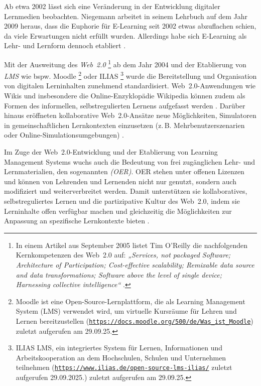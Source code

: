 Ab etwa 2002 lässt sich eine Veränderung in der Entwicklung digitaler Lernmedien beobachten. Niegemann arbeitet in seinem Lehrbuch auf dem Jahr 2009 heraus, dass die Euphorie für E-Learning seit 2002 etwas abzuflachen schien, da viele Erwartungen nicht erfüllt wurden. Allerdings habe sich E-Learning als Lehr- und Lernform dennoch etabliert \parencite[S.~14]{niegemann_kompendium_2008}.

Mit der Ausweitung des \textit{Web~2.0} \footnote{In einem Artikel aus September 2005 listet Tim O'Reilly die nachfolgenden Kernkompetenzen des Web~2.0 auf: \textit{„Services, not packaged Software; Architecture of Participation; Cost-effective scalability; Remixable data source and data transformations; Software above the level of single device; Harnessing collective intelligence“} \cite{oreilly_what_2005}.} ab dem Jahr 2004 und der Etablierung von \textit{\ac{LMS}} wie bspw. Moodle \footnote{Moodle ist eine Open-Source-Lernplattform, die als Learning Management System (LMS) verwendet wird, um virtuelle Kursräume für Lehren und Lernen bereitzustellen (\href{https://docs.moodle.org/500/de/Was_ist_Moodle}{\nolinkurl{https://docs.moodle.org/500/de/Was_ist_Moodle}}) zuletzt aufgerufen am 29.09.25.} oder ILIAS \footnote{ILIAS \ac{LMS}, ein integriertes System für Lernen, Informationen und Arbeitskooperation an dem Hochschulen, Schulen und Unternehmen teilnehmen (\href{https://www.ilias.de/open-source-lms-ilias/}{\nolinkurl{https://www.ilias.de/open-source-lms-ilias/}} zuletzt aufgerufen 29.09.2025.) zuletzt aufgerufen am 29.09.25.} wurde die Bereitstellung und Organisation von digitalen Lerninhalten zunehmend standardisiert. Web~2.0-Anwendungen wie Wikis und insbesondere die Online-Enzyklopädie Wikipedia können zudem als Formen des informellen, selbstregulierten Lernens aufgefasst werden \parencite[S.~14]{niegemann_kompendium_2008}. Darüber hinaus eröffneten kollaborative Web~2.0-Ansätze neue Möglichkeiten, Simulatoren in gemeinschaftlichen Lernkontexten einzusetzen (z.\,B. Mehrbenutzerszenarien oder Online-Simulationsumgebungen) \parencite[S.~129f]{gallagher_assessing_2007}.

Im Zuge der Web~2.0-Entwicklung und der Etablierung von Learning Management Systems wuchs auch die Bedeutung von frei zugänglichen Lehr- und Lernmaterialien, den sogenannten \textit{(\ac{OER})}. \ac{OER} stehen unter offenen Lizenzen und können von Lehrenden und Lernenden nicht nur genutzt, sondern auch modifiziert und weiterverbreitet werden. Damit unterstützen sie kollaboratives, selbstreguliertes Lernen und die partizipative Kultur des Web~2.0, indem sie Lerninhalte offen verfügbar machen und gleichzeitig die Möglichkeiten zur Anpassung an spezifische Lernkontexte bieten \parencites[S.~1]{unesco_guidelines_2011}[S.~194f]{fluhler_open_2024}.
\fi

